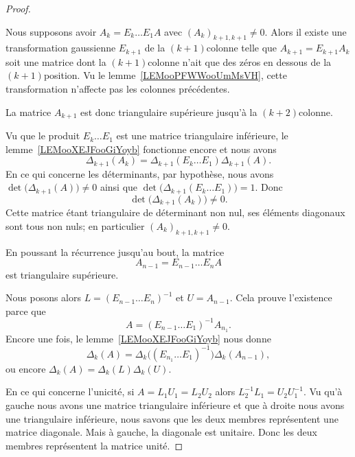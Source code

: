 \begin{proof}
\begin{subproof}

		Nous supposons avoir \( A_k=E_k\ldots E_1A\) avec \( (A_k)_{k+1,k+1}\neq 0\). Alors il existe une transformation gaussienne \( E_{k+1}\) de la \( (k+1)\)\ieme colonne telle que \( A_{k+1}=E_{k+1}A_k\) soit une matrice dont la \( (k+1)\)\ieme colonne n'ait que des zéros en dessous de la \( (k+1)\)\ieme position. Vu le lemme~\ref{LEMooPFWWooUmMsVH}, cette transformation n'affecte pas les colonnes précédentes.

		La matrice \( A_{k+1}\) est donc triangulaire supérieure jusqu'à la \( (k+2)\)\ieme colonne.

		Vu que le produit \( E_k\ldots E_1\) est une matrice triangulaire inférieure, le lemme~\ref{LEMooXEJFooGiYoyb} fonctionne encore et nous avons
		\begin{equation}
			\Delta_{k+1}(A_k)=\Delta_{k+1}(E_k\ldots E_1)\Delta_{k+1}(A).
		\end{equation}
		En ce qui concerne les déterminants, par hypothèse, nous avons \( \det\big( \Delta_{k+1}(A) \big)\neq 0\) ainsi que \( \det\big( \Delta_{k+1}(E_k\ldots E_1) \big)=1\). Donc
		\begin{equation}
			\det\big( \Delta_{k+1}(A_k) \big)\neq 0.
		\end{equation}
		Cette matrice étant triangulaire de déterminant non nul, ses éléments diagonaux sont tous non nuls; en particulier \( (A_k)_{k+1,k+1}\neq 0\).
	\end{subproof}

	En poussant la récurrence jusqu'au bout, la matrice
	\begin{equation}
		A_{n-1}=E_{n-1}\ldots E_nA
	\end{equation}
	est triangulaire supérieure.

	Nous posons alors \(   L=(E_{n-1}\ldots E_n)^{-1}  \) et \( U=A_{n-1}\). Cela prouve l'existence parce que
	\begin{equation}
		A=(E_{n-1}\ldots E_1)^{-1}A_{n_1}.
	\end{equation}
	Encore une fois, le lemme~\ref{LEMooXEJFooGiYoyb} nous donne
	\begin{equation}
		\Delta_k(A)=\Delta_k\Big( (E_{n_1}\ldots E_1)^{-1} \Big)\Delta_k(A_{n-1}),
	\end{equation}
	ou encore \( \Delta_k(A)=\Delta_k(L)\Delta_k(U)\).

	En ce qui concerne l'unicité, si \( A=L_1U_1=L_2U_2\) alors \( L_2^{-1}L_1=U_2U_1^{-1} \). Vu qu'à gauche nous avons une matrice triangulaire inférieure et que à droite nous avons une triangulaire inférieure, nous savons que les deux membres représentent une matrice diagonale. Mais à gauche, la diagonale est unitaire. Donc les deux membres représentent la matrice unité.
\end{proof}

